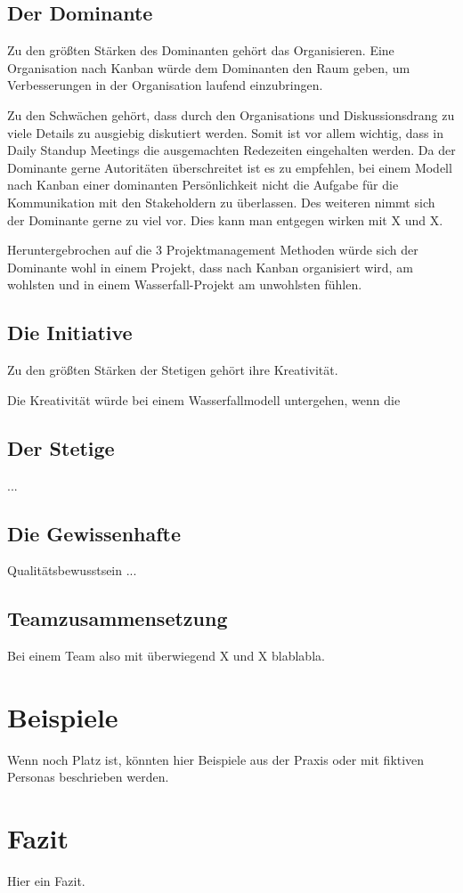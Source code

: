 \documentclass[twocolumn,10pt]{asme2ej}
\begin{document}
\subsection{Der Dominante}
Zu den größten Stärken des Dominanten gehört das Organisieren. Eine Organisation nach Kanban würde dem Dominanten den Raum geben, um Verbesserungen in der Organisation laufend einzubringen.

Zu den Schwächen gehört, dass durch den Organisations und Diskussionsdrang zu viele Details zu ausgiebig diskutiert werden. Somit ist vor allem wichtig, dass in Daily Standup Meetings die ausgemachten Redezeiten eingehalten werden. Da der Dominante gerne Autoritäten überschreitet ist es zu empfehlen, bei einem Modell nach Kanban einer dominanten Persönlichkeit nicht die Aufgabe für die Kommunikation mit den Stakeholdern zu überlassen. Des weiteren nimmt sich der Dominante gerne zu viel vor. Dies kann man entgegen wirken mit X und X.

Heruntergebrochen auf die 3 Projektmanagement Methoden würde sich der Dominante wohl in einem Projekt, dass nach Kanban organisiert wird, am wohlsten und in einem Wasserfall-Projekt am unwohlsten fühlen.

\subsection{Die Initiative}
Zu den größten Stärken der Stetigen gehört ihre Kreativität.

Die Kreativität würde bei einem Wasserfallmodell untergehen, wenn die 

\subsection{Der Stetige}
...

\subsection{Die Gewissenhafte}
Qualitätsbewusstsein
...


\subsection{Teamzusammensetzung}
Bei einem Team also mit überwiegend X und X blablabla.

\section{Beispiele}
Wenn noch Platz ist, könnten hier Beispiele aus der Praxis oder mit fiktiven Personas beschrieben werden.

\section{Fazit}
Hier ein Fazit.




\end{document}
